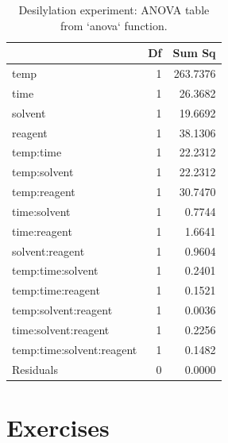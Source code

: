 \documentclass[
]{book}
\theoremstyle{definition}
\theoremstyle{definition}
\theoremstyle{definition}
\theoremstyle{definition}
\theoremstyle{remark}
\begin{document}
\begin{table}

\caption{\label{tab:desilylation-anova-ss}Desilylation experiment: ANOVA table from `anova` function.}
\centering
\begin{tabular}[t]{l|r|r}
\hline
  & Df & Sum Sq\\
\hline
temp & 1 & 263.7376\\
\hline
time & 1 & 26.3682\\
\hline
solvent & 1 & 19.6692\\
\hline
reagent & 1 & 38.1306\\
\hline
temp:time & 1 & 22.2312\\
\hline
temp:solvent & 1 & 22.2312\\
\hline
temp:reagent & 1 & 30.7470\\
\hline
time:solvent & 1 & 0.7744\\
\hline
time:reagent & 1 & 1.6641\\
\hline
solvent:reagent & 1 & 0.9604\\
\hline
temp:time:solvent & 1 & 0.2401\\
\hline
temp:time:reagent & 1 & 0.1521\\
\hline
temp:solvent:reagent & 1 & 0.0036\\
\hline
time:solvent:reagent & 1 & 0.2256\\
\hline
temp:time:solvent:reagent & 1 & 0.1482\\
\hline
Residuals & 0 & 0.0000\\
\hline
\end{tabular}
\end{table}

\hypertarget{exercises-3}{%
\section{Exercises}\label{exercises-3}}
\end{document}
